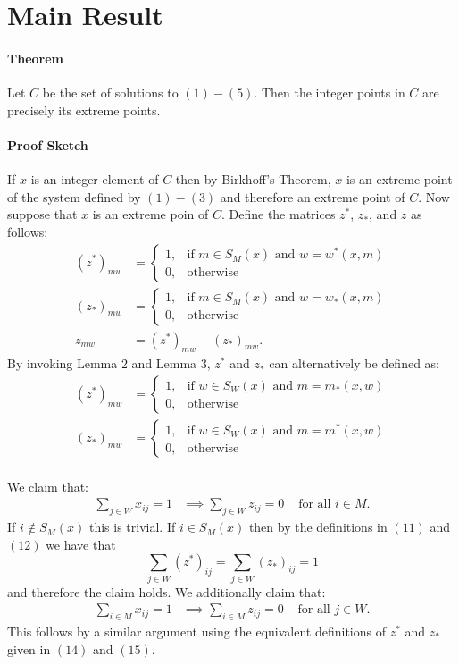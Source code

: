 \documentclass[letterpaper,12pt,oneside,onecolumn]{article}
\begin{document}
\section*{Main Result}
\paragraph{Theorem}
Let $C$ be the set of solutions to $(1) - (5)$. Then the integer points in $C$ are precisely its extreme points.
\paragraph{Proof Sketch}
If $x$ is an integer element of $C$ then by Birkhoff's Theorem, $x$ is an extreme point of the system defined by $(1)-(3)$ and therefore an extreme point of $C$. Now suppose that $x$ is an extreme poin of $C$.
Define the matrices $z^*$, $z_*$, and $z$ as follows:
\begin{align}
(z^*)_{mw} &= \begin{cases}
	1, &\text{if $m\in S_M(x)$ and $w = w^*(x,m)$} \\
	0, &\text{otherwise}
\end{cases} 
\\
(z_*)_{mw} &= \begin{cases}
	1, &\text{if $m\in S_M(x)$ and $w = w_*(x,m)$} \\
	0, &\text{otherwise}
\end{cases}
\\
z_{mw} &= (z^*)_{mw} - (z_*)_{mw}.
\end{align}
By invoking Lemma $2$ and Lemma $3$, $z^*$ and $z_*$ can alternatively be defined as:
\begin{align}
(z^*)_{mw} &= \begin{cases}
	1, &\text{if $w\in S_W(x)$ and $m = m_*(x,w)$} \\
	0, &\text{otherwise}
\end{cases} 
\\
(z_*)_{mw} &= \begin{cases}
	1, &\text{if $w\in S_W(x)$ and $m = m^*(x,w)$} \\
	0, &\text{otherwise}
\end{cases}
\end{align}
\paragraph{}
We claim that:
\begin{align}
\sum_{j \in W} x_{ij} = 1 &\implies \sum_{j \in W} z_{ij} = 0 &\text{ for all $i \in M$}.
\end{align}
If $i \not\in S_M(x)$ this is trivial. If $i \in S_M(x)$ then by the definitions in $(11)$ and $(12)$ we have that $$\sum_{j \in W} (z^*)_{ij} = \sum_{j \in W} (z_*)_{ij} = 1$$ and therefore the claim holds. We additionally claim that:
\begin{align}
\sum_{i \in M} x_{ij} = 1 &\implies \sum_{i \in M} z_{ij} = 0 &\text{ for all $j \in W$}.
\end{align}
This follows by a similar argument using the equivalent definitions of $z^*$ and $z_*$ given in $(14)$ and $(15)$.
\end{document}
